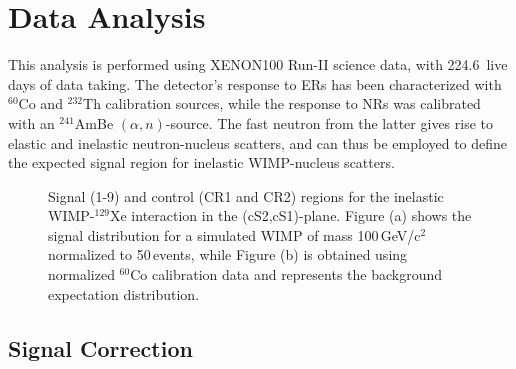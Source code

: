 \section{Data Analysis}
\label{sec:analysis}

This analysis is performed using XENON100 Run-II science data, with 224.6~live days of data taking. The detector's response to ERs has been characterized with $^{60}$Co and $^{232}$Th calibration sources, while the response to NRs was calibrated with an $^{241}$AmBe $(\alpha,n)$-source. The fast neutron from the latter gives rise to elastic and inelastic neutron-nucleus scatters, and can thus be employed to define the expected signal region for inelastic WIMP-nucleus scatters.


\begin{figure}[t!]
	\caption{Signal (1-9) and control (CR1 and CR2) regions for the inelastic WIMP-$^{129}$Xe interaction in the (cS2,cS1)-plane.
		Figure (a) shows the signal distribution for a simulated WIMP of mass 100\,GeV/c$^2$ normalized to 50\,events, while Figure (b) is obtained using  
		normalized $^{60}$Co calibration data and represents the background expectation distribution.}
  \label{fig:SR}
\end{figure}

\subsection{Signal Correction} 

